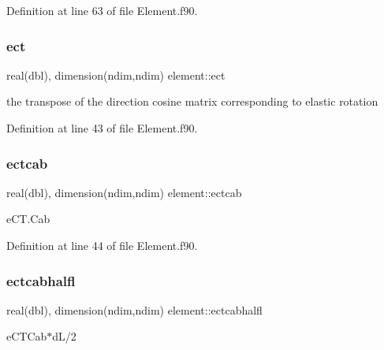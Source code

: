 Definition at line 63 of file Element.\+f90.

\mbox{\label{namespaceelement_a355b3273dce5e581cf75d079f4f4557d}} 
\subsubsection{\texorpdfstring{ect}{ect}}
{\footnotesize\ttfamily real(dbl), dimension(ndim,ndim) element\+::ect\hspace{0.3cm}{\ttfamily [private]}}



the transpose of the direction cosine matrix corresponding to elastic rotation 



Definition at line 43 of file Element.\+f90.

\mbox{\label{namespaceelement_a94c9e7eb21bc71af7de19ee37093b959}} 
\subsubsection{\texorpdfstring{ectcab}{ectcab}}
{\footnotesize\ttfamily real(dbl), dimension(ndim,ndim) element\+::ectcab\hspace{0.3cm}{\ttfamily [private]}}



e\+C\+T.\+Cab 



Definition at line 44 of file Element.\+f90.

\mbox{\label{namespaceelement_afa3adc34db2cdcd479dd21a3873ef5d1}} 
\subsubsection{\texorpdfstring{ectcabhalfl}{ectcabhalfl}}
{\footnotesize\ttfamily real(dbl), dimension(ndim,ndim) element\+::ectcabhalfl\hspace{0.3cm}{\ttfamily [private]}}



e\+C\+T\+Cab$\ast$d\+L/2 



